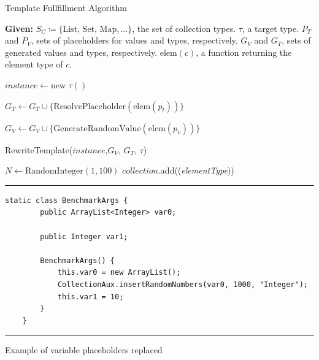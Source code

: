 \begin{algorithm}[H]
\caption{Template Fullfillment Algorithm}
\label{alg:test_generation}
\begin{algorithmic}[1]
    \Statex \textbf{Given:}
    \Statex \hspace{\algorithmicindent} $S_C \coloneqq \{\text{List, Set, Map}, \dots\}$, the set of collection types.
    \Statex \hspace{\algorithmicindent} $\tau$, a target type.
    \Statex \hspace{\algorithmicindent} $P_T$ and $P_V$, sets of placeholders for values and types, respectively.
    \Statex \hspace{\algorithmicindent} $G_V$ and $G_T$, sets of generated values and types, respectively.
    \Statex \hspace{\algorithmicindent} $\text{elem}(c)$, a function returning the element type of $c$.

    \State $\textit{instance} \gets \text{new } \tau()$ 
    
    
        \State {} 
    \EndIf

        \State $G_T \gets G_T \cup \{\text{ResolvePlaceholder}(\text{elem}(p_t))\}$
    \EndFor

        \State $G_V \gets G_V \cup \{\text{GenerateRandomValue}(\text{elem}(p_v))\}$
    \EndFor

    \State RewriteTemplate({$\textit{instance}$,$G_V$, $G_T$, $\tau$})
\EndProcedure

\vspace{1em} 

    \State $\textit{N} \gets \text{RandomInteger}(1, 100)$ 
        \State $\textit{collection}$.add((\textit{elementType}))
    \EndFor
\EndProcedure
\end{algorithmic}
\end{algorithm}

\begin{listing}[H]
\noindent\rule{\linewidth}{0.4pt}
\begin{verbatim}
static class BenchmarkArgs {
        public ArrayList<Integer> var0;

        public Integer var1;

        BenchmarkArgs() {
            this.var0 = new ArrayList();
            CollectionAux.insertRandomNumbers(var0, 1000, "Integer");
            this.var1 = 10;
        }
    }
\end{verbatim}
\noindent\rule{\linewidth}{0.4pt}
\caption{Example of variable placeholders replaced}            
\label{lst:var_placeholders_replaced}
\end{listing}



